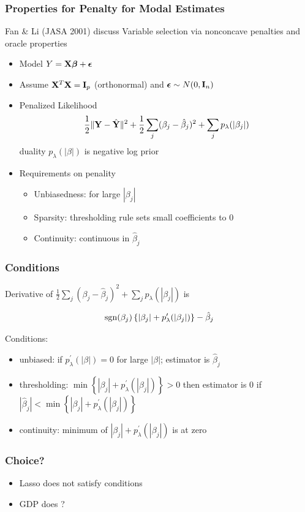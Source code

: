 \documentclass[handout]{beamer}
\begin{document}
\begin{frame} \frametitle{Properties for Penalty for Modal Estimates}
Fan \& Li (JASA 2001) discuss Variable
selection via nonconcave penalties and oracle properties  \pause
\begin{itemize}
\item Model $Y = \mathbf{X} \boldsymbol{\beta} + \boldsymbol{\epsilon}$ \pause
\item Assume $\mathbf{X}^T\mathbf{X} = \mathbf{I}_p$  (orthonormal) and $\boldsymbol{\epsilon} \sim N(0, \mathbf{I}_n)$\pause
\item Penalized Likelihood
$$\frac 1 2 \|\mathbf{Y} - \hat{\mathbf{Y}}\|^2 + \frac 1 2 \sum_j(\beta_j - \hat{\beta}_j)^2 +  \sum_j p_\lambda(|\beta_j|)$$ \pause
duality $ p_\lambda(|\beta|)$ is negative log prior

\item Requirements on penality \pause
\begin{itemize}
  \item Unbiasedness: for large $|\beta_j|$ \pause
  \item Sparsity: thresholding rule sets small coefficients to 0 \pause
  \item Continuity:  continuous in $\hat{\beta}_j$
\end{itemize}
\end{itemize}
\end{frame}


\begin{frame} \frametitle{Conditions}
Derivative of  $\frac 1 2 \sum_j(\beta_j - \hat{\beta}_j)^2 +  \sum_j p_\lambda(|\beta_j|)$
is

$$\operatorname{sgn}(\beta_j)\left\{|\beta_j| + p^\prime_\lambda(|\beta_j|) \right\} - \hat{\beta}_j$$

Conditions:

\begin{itemize}
\item unbiased: if $ p^\prime_\lambda(|\beta|) = 0$ for large $|\beta|$; estimator is $\hat{\beta}_j$
\item thresholding: $\min \left\{ |\beta_j| + p^\prime_\lambda(|\beta_j|)\right\} > 0$ then estimator is 0 if $|\hat{\beta}_j| < \min \left\{ |\beta_j| + p^\prime_\lambda(|\beta_j|) \right\} $
\item continuity:  minimum of $|\beta_j| + p^\prime_\lambda(|\beta_j|)$ is at zero
\end{itemize}
\end{frame}

\begin{frame}\frametitle{Choice?}
\begin{itemize}
\item Lasso does not satisfy conditions
\item GDP does ?
\end{itemize}
\end{frame}
\end{document}
